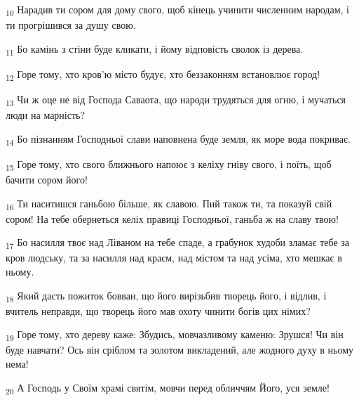 \begin{tcolorbox}
\textsubscript{10} Нарадив ти сором для дому свого, щоб кінець учинити численним народам, і ти прогрішився за душу свою.
\end{tcolorbox}
\begin{tcolorbox}
\textsubscript{11} Бо камінь з стіни буде кликати, і йому відповість сволок із дерева.
\end{tcolorbox}
\begin{tcolorbox}
\textsubscript{12} Горе тому, хто кров'ю місто будує, хто беззаконням встановлює город!
\end{tcolorbox}
\begin{tcolorbox}
\textsubscript{13} Чи ж оце не від Господа Саваота, що народи трудяться для огню, і мучаться люди на марність?
\end{tcolorbox}
\begin{tcolorbox}
\textsubscript{14} Бо пізнанням Господньої слави наповнена буде земля, як море вода покриває.
\end{tcolorbox}
\begin{tcolorbox}
\textsubscript{15} Горе тому, хто свого ближнього напоює з келіху гніву свого, і поїть, щоб бачити сором його!
\end{tcolorbox}
\begin{tcolorbox}
\textsubscript{16} Ти наситишся ганьбою більше, як славою. Пий також ти, та показуй свій сором! На тебе обернеться келіх правиці Господньої, ганьба ж на славу твою!
\end{tcolorbox}
\begin{tcolorbox}
\textsubscript{17} Бо насилля твоє над Ліваном на тебе спаде, а грабунок худоби зламає тебе за кров людську, та за насилля над краєм, над містом та над усіма, хто мешкає в ньому.
\end{tcolorbox}
\begin{tcolorbox}
\textsubscript{18} Який дасть пожиток бовван, що його вирізьбив творець його, і відлив, і вчитель неправди, що творець його мав охоту чинити богів цих німих?
\end{tcolorbox}
\begin{tcolorbox}
\textsubscript{19} Горе тому, хто дереву каже: Збудись, мовчазливому каменю: Зрушся! Чи він буде навчати? Ось він сріблом та золотом викладений, але жодного духу в ньому нема!
\end{tcolorbox}
\begin{tcolorbox}
\textsubscript{20} А Господь у Своїм храмі святім, мовчи перед обличчям Його, уся земле!
\end{tcolorbox}

